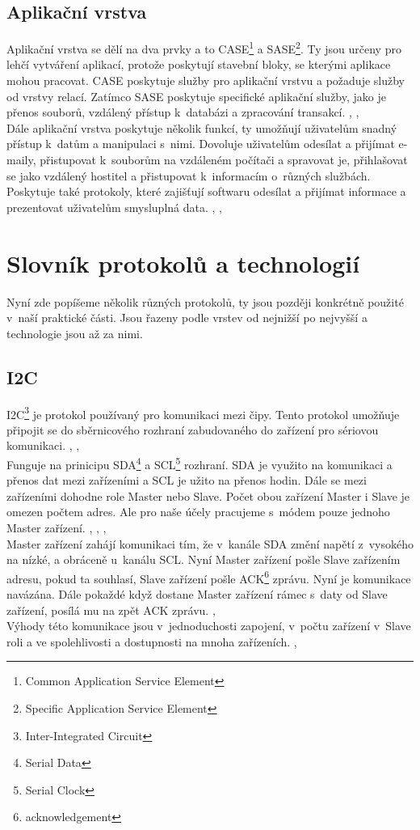 \documentclass[12pt]{report}			%
\begin{document}
				\subsection{Aplikační vrstva}
Aplikační vrstva se dělí na dva prvky a to CASE\footnote{Common Application Service Element} a SASE\footnote{Specific Application Service Element}. Ty jsou určeny pro lehčí vytváření aplikací, protože poskytují stavební bloky, se kterými aplikace mohou pracovat. CASE poskytuje služby pro aplikační vrstvu a požaduje služby od vrstvy relací. Zatímco SASE poskytuje specifické aplikační služby, jako je přenos souborů, vzdálený přístup k~databázi a zpracování transakcí. \cite{aplication1}, \cite{aplication2}, \cite{aplication3}
\\
Dále aplikační vrstva poskytuje několik funkcí, ty umožňují uživatelům snadný přístup k~datům a manipulaci s~nimi. Dovoluje uživatelům odesílat a přijímat e-maily, přistupovat k~souborům na vzdáleném počítači a spravovat je, přihlašovat se jako vzdálený hostitel a přistupovat k~informacím o~různých službách. Poskytuje také protokoly, které zajišťují softwaru odesílat a přijímat informace a prezentovat uživatelům smysluplná data. \cite{aplication1}, \cite{aplication2}, \cite{aplication3}


			\section{Slovník protokolů a technologií}
			
			
Nyní zde popíšeme několik různých protokolů, ty jsou později konkrétně použité v~naší praktické části. Jsou řazeny podle vrstev od nejnižší po nejvyšší a technologie jsou až za nimi.


				\subsection{I2C}
				
				
I2C\footnote{Inter-Integrated Circuit} je protokol používaný pro komunikaci mezi čipy. Tento protokol umožňuje připojit se do sběrnicového rozhraní zabudovaného do zařízení pro sériovou komunikaci. \cite{i2c4}, \cite{i2c1}, \cite{i2c3}
\\
Funguje na prinicipu SDA\footnote{Serial Data} a SCL\footnote{Serial Clock} rozhraní. SDA je využito na komunikaci a přenos dat mezi zařízeními a SCL je užito na přenos hodin. Dále se mezi zařízeními dohodne role Master nebo Slave. Počet obou zařízení Master i Slave je omezen počtem adres. Ale pro naše účely pracujeme s~módem pouze jednoho Master zařízení. \cite{i2c4}, \cite{i2c1}, \cite{i2c3}, \cite{i2c4}
\\
 Master zařízení zahájí komunikaci tím, že v~kanále SDA změní napětí z~vysokého na nízké, a obráceně u~kanálu SCL. Nyní Master zařízení pošle Slave zařízením adresu, pokud ta souhlasí, Slave zařízení pošle ACK\footnote{acknowledgement} zprávu. Nyní je komunikace navázána. Dále pokaždé když dostane Master zařízení rámec s~daty od Slave zařízení, posílá mu na zpět ACK zprávu. \cite{i2c4}, \cite{i2c3}
\\
Výhody této komunikace jsou v~jednoduchosti zapojení, v~počtu zařízení v~Slave roli a ve spolehlivosti a dostupnosti na mnoha zařízeních.  \cite{i2c1}, \cite{i2c4}
\end{document}
